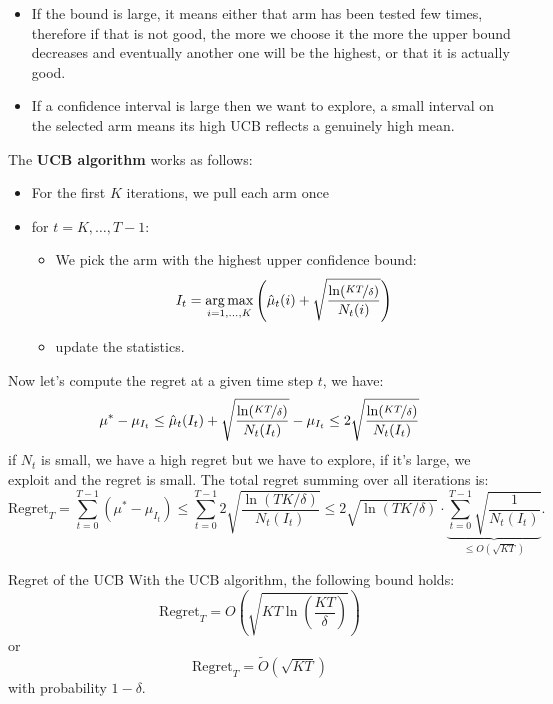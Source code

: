 \documentclass[10pt, a4paper]{report}
\begin{document}
\begin{itemize}
    \item If the bound is large, it means either that arm has been tested few times, therefore if that is
 not good, the more we choose it the more the upper bound decreases and eventually
 another one will be the highest, or that it is actually good.
    \item If a confidence interval is large then we want to explore, a small interval on the selected arm means its high UCB reflects a genuinely high mean.

\end{itemize}
\noindent The \textbf{UCB algorithm} works as follows:\begin{itemize}
    \item For the first $K$ iterations, we pull each arm once
    \item for $t=K,\dots, T-1$:\begin{itemize}
        \item We pick the arm with the highest upper confidence bound:\begin{equation}
            I_t= \operatorname*{arg\,max}_{i=1,\dots,K}\left(
                \hat\mu_t(i)+\sqrt{\frac{\ln(\nicefrac{KT}{\delta})}{N_t(i)}}
            \right)
        \end{equation}
        \item update the statistics.
    \end{itemize}
\end{itemize}
\noindent  Now let's compute the regret at a given time step $t$, we have:\begin{equation}
    \mu^*-\mu_{I_t}\le\hat\mu_t(I_t)+\sqrt{\frac{\ln(\nicefrac{KT}{\delta})}{N_t(I_t)}}-\mu_{I_t}\le 2\sqrt{\frac{\ln(\nicefrac{KT}{\delta})}{N_t(I_t)}}
\end{equation}
if $N_t$ is small, we have a high regret but we have to explore, if it's large, we exploit and the regret is small. The total regret summing over all iterations is:\begin{equation}
    \text{Regret}_T = \sum_{t=0}^{T-1} (\mu^* - \mu_{I_t}) \le \sum_{t=0}^{T-1} 2 \sqrt{\frac{\ln(TK/\delta)}{N_t(I_t)}} \le 2\sqrt{\ln(TK/\delta)} \cdot \underbrace{\sum_{t=0}^{T-1} \sqrt{\frac{1}{N_t(I_t)}}}_{\le O(\sqrt{KT})}.
\end{equation}
\begin{boxtheorem}{Regret of the UCB}{}
    With the UCB algorithm, the following bound holds:
    \begin{equation}
        \text{Regret}_T= O\left(\sqrt{KT\ln\left(\frac{KT}{\delta}\right)}\right)
    \end{equation}
    or
    \begin{equation}
        \text{Regret}_T=\tilde O(\sqrt{KT})
    \end{equation}
    with probability $1-\delta$.
\end{boxtheorem}
\end{document}
